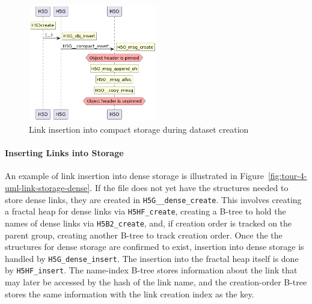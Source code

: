 \begin{figure}
    \centering
    \includegraphics[width=0.5\textwidth]{images/tour_4_uml_link_storage_compact.png}
    \caption{Link insertion into compact storage during dataset creation}
    \label{fig:tour-4-uml-link-storage-compact}
\end{figure}

\paragraph{Inserting Links into Storage} An example of link insertion into dense storage is illustrated in Figure~\ref{fig:tour-4-uml-link-storage-dense}. If the file does not yet have the structures needed to store dense links, they are created in \texttt{H5G\_\_dense\_create}. This involves creating a fractal heap for dense links via \texttt{H5HF\_create}, creating a B-tree to hold the names of dense links via \texttt{H5B2\_create}, and, if creation order is tracked on the parent group, creating another B-tree to track creation order. Once the the structures for dense storage are confirmed to exist, insertion into dense storage is handled by \texttt{H5G\_dense\_insert}. The insertion into the fractal heap itself is done by \texttt{H5HF\_insert}. The name-index B-tree stores information about the link that may later be accessed by the hash of the link name, and the creation-order B-tree stores the same information with the link creation index as the key.

